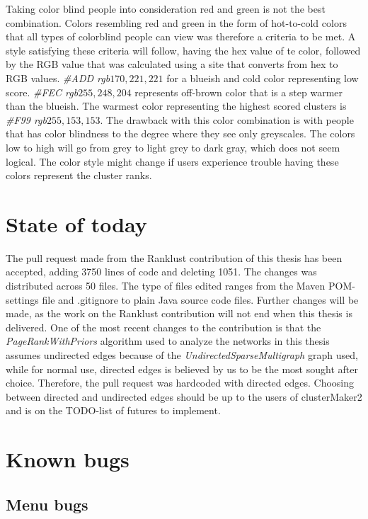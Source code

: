 Taking color blind people into consideration red and green is not the
best combination. Colors resembling red and green in the form of hot-to-cold
colors that all types of colorblind people can view was therefore a criteria to
be met. A style satisfying these criteria will follow, having the hex value of
te color\cite{color-blindness3}, followed by the RGB value that was calculated
using a site that converts from hex to RGB values\cite{color-blindness2}.
\textit{\#ADD rgb\(170,221,221\)} for a blueish and cold color representing low
score. \textit{\#FEC rgb\(255,248,204\)} represents off-brown color that is a step
warmer than the blueish. The warmest color representing the highest scored
clusters is \textit{\#F99 rgb\(255,153,153\)}. The drawback with this color
combination is with people that has color blindness to the degree where they see
only greyscales. The colors low to high will go from grey to light grey to dark
gray, which does not seem logical. The color style might change if users
experience trouble having these colors represent the cluster ranks. 

\section{State of today}
The pull request\cite{git-pull-request} made from the Ranklust
contribution of this thesis has been accepted\cite{ranklust-accepted}, adding
3750 lines of code and deleting 1051. The changes was distributed across 50
files. The type of files edited ranges from the Maven POM-settings file and
.gitignore to plain Java source code files. Further changes will be made, as the
work on the Ranklust contribution will not end when this thesis is delivered.
One of the most recent changes to the contribution is that the
\textit{PageRankWithPriors} algorithm used to analyze the networks in this
thesis assumes undirected edges because of the
\textit{UndirectedSparseMultigraph} graph used, while for normal use, directed
edges is believed by us to be the most sought after choice. Therefore, the pull
request was hardcoded with directed edges. Choosing between directed and
undirected edges should be up to the users of clusterMaker2 and is on the
TODO-list of futures to implement.

\section{Known bugs}
\subsection{Menu bugs}
